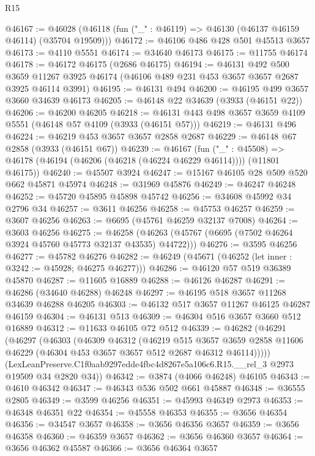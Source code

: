 \begin{lexlean}{R15}
\begin{coremodule}
@46167 := @46028 (@46118 (fun ("_" : @46119) => @46130 (@46137 @46159 @46114) (@35704 @19509)))
@46172 := @46106 @486 @428 @501 @45513 @3657
@46173 := @4110 @5551
@46174 := @34640 @46173
@46175 := @11755 @46174
@46178 := @46172 @46175 (@2686 @46175)
@46194 := @46131
    @492
    @500
    @3659
    @11267
    @3925
    @46174
    (@46106 @489 @231 @453 @3657 @3657 @2687 @3925 @46114 @3991)
@46195 := @46131 @494
@46200 := @46195 @499 @3657 @3660 @34639 @46173
@46205 := @46148 @22 @34639 (@3933 (@46151 @22))
@46206 := @46200 @46205
@46218 := @46131 @443 @498 @3657 @3659 @4109 @5551 (@46148 @57 @4109 (@3933 (@46151 @57)))
@46219 := @46131 @496
@46224 := @46219 @453 @3657 @3657 @2858 @2687
@46229 := @46148 @67 @2858 (@3933 (@46151 @67))
@46239 := @46167
    (fun ("_" : @45508) => @46178 (@46194 (@46206 (@46218 (@46224 @46229 @46114)))) (@11801 @46175))
@46240 := @45507 @3924
@46247 := @15167 @46105 @28 @509 @520 @662 @45871 @45974
@46248 := @31969 @45876
@46249 := @46247 @46248
@46252 := @45720 @45895 @45898 @45742
@46256 := @34608 @45992 @34 @2796 @34
@46257 := @3611 @46256
@46258 := @45753 @46257
@46259 := @3607 @46256
@46263 := @6695 (@45761 @46259 @32137 @7008)
@46264 := @3603 @46256
@46275 := @46258 (@46263 (@45767 (@6695 (@7502 @46264 @3924 @45760 @45773 @32137 @43535) @44722)))
@46276 := @3595 @46256
@46277 := @45782 @46276
@46282 := @46249 (@45671 (@46252 (let inner : @3242 := @45928; @46275 @46277)))
@46286 := @46120 @57 @519 @36389 @45870
@46287 := @11605 @16889
@46288 := @46126 @46287
@46291 := @46286 (@34640 @46288) @46248
@46297 := @46195 @518 @3657 @11268 @34639 @46288 @46205
@46303 := @46132 @517 @3657 @11267 @46125 @46287 @46159
@46304 := @46131 @513
@46309 := @46304 @516 @3657 @3660 @512 @16889
@46312 := @11633 @46105 @72 @512
@46339 := @46282
    (@46291
      (@46297
        (@46303
          (@46309
            @46312
            (@46219
              @515
              @3657
              @3659
              @2858
              @11606
              @46229
              (@46304 @453 @3657 @3657 @512 @2687 @46312 @46114)))))
      (LexLeanPreserve.C1f0aab9297edde4fbc4d8267e5a106c6.R15.__rel_3 @2973 @19509 @34 @2820 @34))
@46342 := @3874 (@4066 @46248) @46105
@46343 := @4610 @46342
@46347 := @46343 @536 @502 @661 @45887
@46348 := @36555 @2805
@46349 := @3599 @46256
@46351 := @45993 @46349 @2973
@46353 := @46348 @46351 @22
@46354 := @45558 @46353
@46355 := @3656 @46354
@46356 := @34547 @3657
@46358 := @3656 @46356 @3657
@46359 := @3656 @46358
@46360 := @46359 @3657
@46362 := @3656 @46360 @3657
@46364 := @3656 @46362 @45587
@46366 := @3656 @46364 @3657

\end{coremodule}
\end{lexlean}
